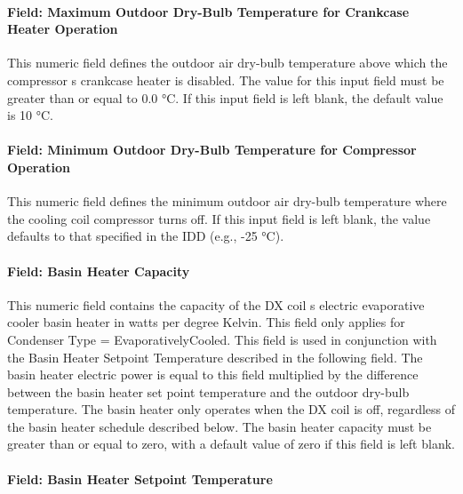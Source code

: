 \paragraph{Field: Maximum Outdoor Dry-Bulb Temperature for Crankcase Heater Operation}\label{field-maximum-outdoor-dry-bulb-temperature-for-crankcase-heater-operation-2}

This numeric field defines the outdoor air dry-bulb temperature above which the compressor s crankcase heater is disabled. The value for this input field must be greater than or equal to 0.0 °C. If this input field is left blank, the default value is 10 °C.

\paragraph{Field: Minimum Outdoor Dry-Bulb Temperature for Compressor Operation}\label{field-minimum-outdoor-dry-bulb-temperature-for-compressor-operation}

This numeric field defines the minimum outdoor air dry-bulb temperature where the cooling coil compressor turns off. If this input field is left blank, the value defaults to that specified in the IDD (e.g., -25 °C).

\paragraph{Field: Basin Heater Capacity}\label{field-basin-heater-capacity-3-000}

This numeric field contains the capacity of the DX coil s electric evaporative cooler basin heater in watts per degree Kelvin. This field only applies for Condenser Type = EvaporativelyCooled. This field is used in conjunction with the Basin Heater Setpoint Temperature described in the following field. The basin heater electric power is equal to this field multiplied by the difference between the basin heater set point temperature and the outdoor dry-bulb temperature. The basin heater only operates when the DX coil is off, regardless of the basin heater schedule described below. The basin heater capacity must be greater than or equal to zero, with a default value of zero if this field is left blank.

\paragraph{Field: Basin Heater Setpoint Temperature}\label{field-basin-heater-setpoint-temperature-3-000}

